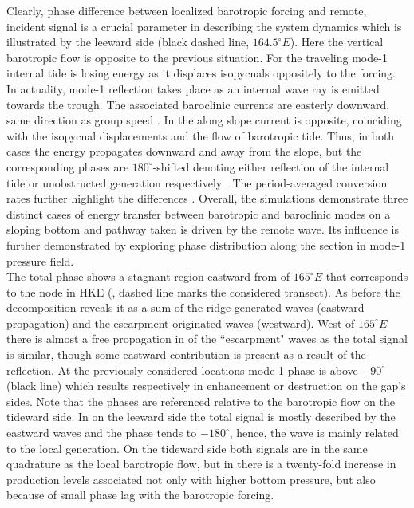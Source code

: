 \documentclass[12pt]{article}
\begin{document}
Clearly, phase difference between localized barotropic forcing and remote, incident signal is a 
crucial parameter in describing the system dynamics which is illustrated by the leeward side (black 
dashed line, $164.5^{\circ}E$). Here the vertical barotropic flow is opposite to the previous 
situation. For  the traveling mode-1 internal tide is losing energy as it displaces 
isopycnals oppositely to the forcing. In actuality, mode-1 reflection takes place as an internal 
wave ray is emitted towards the trough. The associated baroclinic currents are easterly downward, 
same direction as group speed . In  the along slope current 
is opposite, coinciding with the isopycnal displacements and the flow of barotropic tide. Thus, in 
both cases the energy propagates downward and away from the slope, but the corresponding phases are 
$180^{\circ}$-shifted denoting either reflection of the internal tide or unobstructed generation 
respectively . The period-averaged conversion rates further highlight the 
differences . Overall, the simulations demonstrate three distinct cases 
of energy transfer between barotropic and baroclinic modes on a sloping bottom and pathway taken 
is driven by the remote wave. Its influence is further demonstrated by exploring phase distribution 
along the section  in mode-1 pressure field.\\

The total phase shows a stagnant region eastward from of $165^{\circ}E$ that corresponds to the 
node in HKE (, dashed line marks the considered transect). As before 
the decomposition reveals it as a sum of the ridge-generated waves (eastward propagation) and the 
escarpment-originated waves (westward). West of $165^{\circ}E$ there is almost a free propagation 
in  of the ``escarpment" waves as the total signal is similar, though some eastward 
contribution is present as a result of the reflection. At the previously considered locations 
mode-1 phase is above $-90^{\circ}$ (black line) which results respectively in enhancement or 
destruction on the gap's sides. Note that the phases are referenced relative to the barotropic 
flow on the tideward side. In  on the leeward side the total signal is mostly described 
by the eastward waves and the phase tends to $-180^{\circ}$, hence, the wave is mainly related to 
the local generation. On the tideward side both signals are in the same quadrature as the local 
barotropic flow, but in  there is a twenty-fold increase in production levels 
associated not only with higher bottom pressure, but also because of small phase lag with the 
barotropic forcing.
\end{document}

